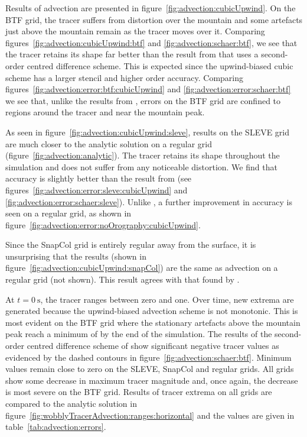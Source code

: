 Results of advection are presented in figure~\ref{fig:advection:cubicUpwind}.
On the BTF grid, the tracer suffers from distortion over the mountain and some artefacts just above the mountain remain as the tracer moves over it.  Comparing figures~\ref{fig:advection:cubicUpwind:btf} and \ref{fig:advection:schaer:btf}, we see that the tracer retains its shape far better than the result from \textcite{schaer2002} that uses a second-order centred difference scheme.  This is expected since the upwind-biased cubic scheme has a larger stencil and higher order accuracy.  Comparing figures~\ref{fig:advection:error:btf:cubicUpwind} and \ref{fig:advection:error:schaer:btf} we see that, unlike the results from \textcite{schaer2002}, errors on the BTF grid are confined to regions around the tracer and near the mountain peak.

As seen in figure~\ref{fig:advection:cubicUpwind:sleve}, results on the SLEVE grid are much closer to the analytic solution on a regular grid (figure~\ref{fig:advection:analytic}).  The tracer retains its shape throughout the simulation and does not suffer from any noticeable distortion.  We find that accuracy is slightly better than the result from \textcite{schaer2002} (see figures~\ref{fig:advection:error:sleve:cubicUpwind} and \ref{fig:advection:error:schaer:sleve}).  Unlike \textcite{schaer2002}, a further improvement in accuracy is seen on a regular grid, as shown in figure~\ref{fig:advection:error:noOrography:cubicUpwind}.

Since the SnapCol grid is entirely regular away from the surface, it is unsurprising that the results (shown in figure~\ref{fig:advection:cubicUpwind:snapCol}) are the same as advection on a regular grid (not shown).  This result agrees with that found by \textcite{good2013}.

At $t = \SI{0}{\second}$, the tracer ranges between zero and one.  Over time, new extrema are generated because the upwind-biased advection scheme is not monotonic.  This is most evident on the BTF grid where the stationary artefacts above the mountain peak reach a minimum of  by the end of the simulation.  The results of the second-order centred difference scheme of \textcite{schaer2002} show significant negative tracer values as evidenced by the dashed contours in figure~\ref{fig:advection:schaer:btf}.  Minimum values remain close to zero on the SLEVE, SnapCol and regular grids.  All grids show some decrease in maximum tracer magnitude and, once again, the decrease is most severe on the BTF grid.  Results of tracer extrema on all grids are compared to the analytic solution in figure~\ref{fig:wobblyTracerAdvection:ranges:horizontal} and the values are given in table~\ref{tab:advection:errors}.

